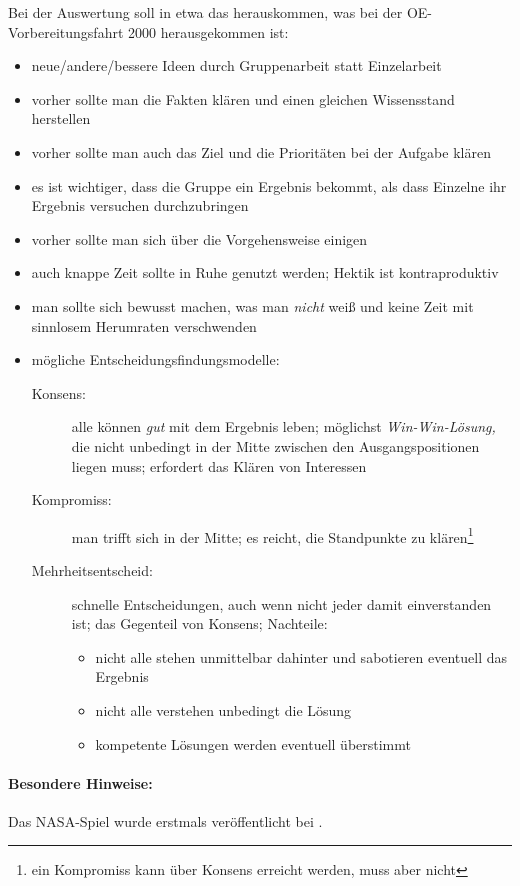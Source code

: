 Bei der Auswertung soll in etwa das herauskommen, was bei der OE-Vor\-be\-rei\-tungs\-fahrt 2000 herausgekommen ist:
\begin{itemize}
  \item neue/andere/bessere Ideen durch Gruppenarbeit statt Einzelarbeit
  \item vorher sollte man die Fakten klären und einen gleichen Wissensstand herstellen
  \item vorher sollte man auch das Ziel und die Prioritäten bei der Aufgabe klären
  \item es ist wichtiger, dass die Gruppe ein Ergebnis bekommt, als dass Einzelne ihr Ergebnis versuchen durchzubringen
  \item vorher sollte man sich über die Vorgehensweise einigen
  \item auch knappe Zeit sollte in Ruhe genutzt werden; Hektik ist kontraproduktiv
  \item man sollte sich bewusst machen, was man \emph{nicht} weiß und keine Zeit mit sinnlosem Herumraten verschwenden
  \item mögliche Entscheidungsfindungsmodelle:
    \begin{description}
      \item [Konsens:] alle können \emph{gut} mit dem Ergebnis leben; möglichst \emph{Win-Win-Lösung,} die nicht unbedingt in der Mitte zwischen den Ausgangspositionen liegen muss; erfordert das Klären von Interessen
      \item [Kompromiss:] man trifft sich in der Mitte; es reicht, die Standpunkte zu klären\footnote{ein Kompromiss kann über Konsens erreicht werden, muss aber nicht}
      \item [Mehrheitsentscheid:] schnelle Entscheidungen, auch wenn nicht jeder damit einverstanden ist; das Gegenteil von Konsens; Nachteile:
      \begin{itemize}
        \item nicht alle stehen unmittelbar dahinter und sabotieren eventuell das Ergebnis
        \item nicht alle verstehen unbedingt die Lösung
        \item kompetente Lösungen werden eventuell überstimmt
      \end{itemize}
    \end{description}
\end{itemize}
\paragraph{Besondere Hinweise:} Das NASA-Spiel wurde erstmals veröffentlicht bei \cite{nasa}.

